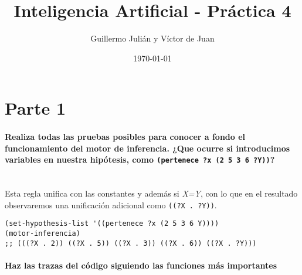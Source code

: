 \documentclass[nochap]{apuntes}
\author{Guillermo Julián y Víctor de Juan}
\date{\today}
\title{Inteligencia Artificial - Práctica 4}
\begin{document}
\maketitle
\section*{Parte 1}

\paragraph{Realiza todas las pruebas posibles para conocer a fondo el funcionamiento del motor de inferencia. ¿Que ocurre si introducimos variables en nuestra hipótesis, como \texttt{(pertenece ?x (2 5 3 6 ?Y))}?\\\\}

Esta regla unifica con las constantes y además si \textit{X=Y}, con lo que en el resultado observaremos una unificación adicional como \texttt{((?X . ?Y))}.\\

\begin{lstlisting}
(set-hypothesis-list '((pertenece ?x (2 5 3 6 Y))))
(motor-inferencia)
;; (((?X . 2)) ((?X . 5)) ((?X . 3)) ((?X . 6)) ((?X . ?Y)))
\end{lstlisting}

\paragraph{Haz las trazas del código siguiendo las funciones más importantes}
\end{document}
